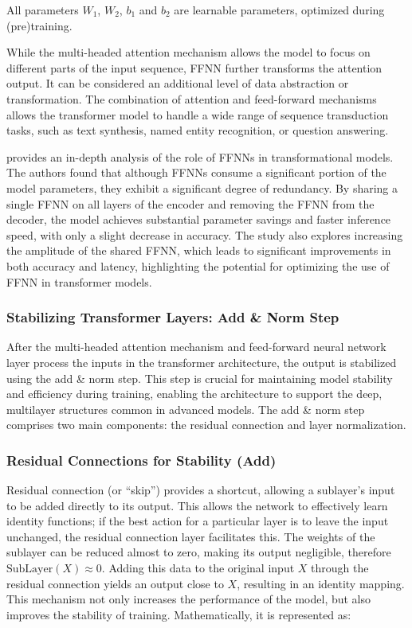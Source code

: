 \begin{itemize}
All parameters \( W_1 \), \( W_2 \), \( b_1 \) and \( b_2 \) are learnable parameters, optimized during (pre)training.

While the multi-headed attention mechanism allows the model to focus on different parts of the input sequence, FFNN further transforms the attention output. It can be considered an additional level of data abstraction or transformation. The combination of attention and feed-forward mechanisms allows the transformer model to handle a wide range of sequence transduction tasks, such as text synthesis, named entity recognition, or question answering.

\cite{pires2023one} provides an in-depth analysis of the role of FFNNs in transformational models. The authors found that although FFNNs consume a significant portion of the model parameters, they exhibit a significant degree of redundancy. By sharing a single FFNN on all layers of the encoder and removing the FFNN from the decoder, the model achieves substantial parameter savings and faster inference speed, with only a slight decrease in accuracy. The study also explores increasing the amplitude of the shared FFNN, which leads to significant improvements in both accuracy and latency, highlighting the potential for optimizing the use of FFNN in transformer models.

\subsubsection{Stabilizing Transformer Layers: Add \& Norm Step}

After the multi-headed attention mechanism and feed-forward neural network layer process the inputs in the transformer architecture, the output is stabilized using the add \& norm step. This step is crucial for maintaining model stability and efficiency during training, enabling the architecture to support the deep, multilayer structures common in advanced models. The add \& norm step comprises two main components: the residual connection and layer normalization.

\subsubsection{Residual Connections for Stability (Add)}

Residual connection (or “skip”) provides a shortcut, allowing a sublayer's input to be added directly to its output. This allows the network to effectively learn identity functions; if the best action for a particular layer is to leave the input unchanged, the residual connection layer facilitates this. The weights of the sublayer can be reduced almost to zero, making its output negligible, therefore \(\text{SubLayer}(X) \approx 0\). Adding this data to the original input \(X\) through the residual connection yields an output close to \(X\), resulting in an identity mapping. This mechanism not only increases the performance of the model, but also improves the stability of training. Mathematically, it is represented as:


\end{itemize}

